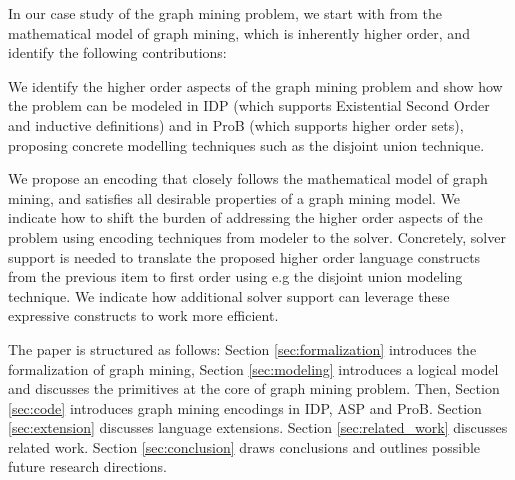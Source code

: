 In our case study of the graph mining problem, we start with from the mathematical model of graph mining, which is inherently higher order, and identify the following contributions:
\begin{compactitem}
\item We identify the higher order aspects of the graph mining problem and  show how the problem can be modeled in IDP (which supports Existential Second Order and inductive definitions)  and in ProB (which supports higher order sets), proposing concrete modelling techniques such as the disjoint union technique.  
\item We propose an encoding that closely follows the mathematical model of graph mining, and satisfies all desirable properties of a graph mining model.
We indicate how to shift the burden of addressing the higher order aspects of the problem using encoding techniques from modeler to the solver. 
Concretely, solver support is needed to translate the proposed higher order language constructs from the previous item to first order using e.g the disjoint union modeling technique.
We indicate how additional solver support can leverage these expressive constructs to work more efficient.
\end{compactitem}
The paper is structured as follows: Section \ref{sec:formalization} introduces the formalization of graph mining, Section \ref{sec:modeling} introduces a logical model and discusses the primitives at the core of graph mining problem.
Then, Section \ref{sec:code} introduces graph mining encodings in IDP, ASP and ProB. Section \ref{sec:extension} discusses language extensions.
Section \ref{sec:related_work} discusses related work. Section \ref{sec:conclusion} draws conclusions and outlines possible future research directions.